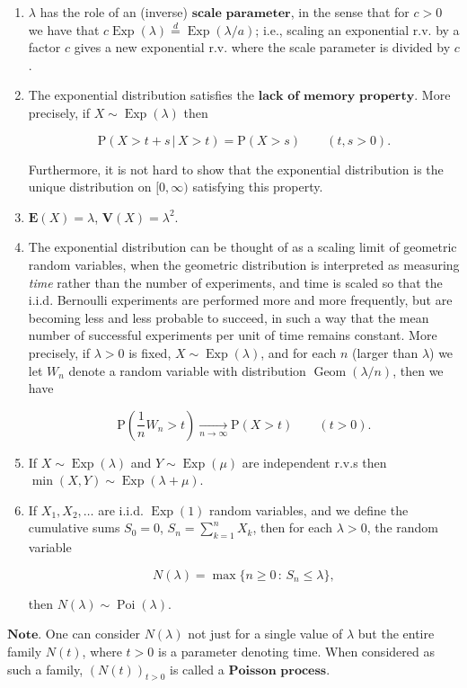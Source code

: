 \begin{enumerate}[label=\arabic*.]
\item $\lambda$ has the role of an (inverse)
$\textbf{scale parameter}$, in the sense that for
$c>0$ we have that
$c \operatorname{Exp}(\lambda) \stackrel{d}{=}
\operatorname{Exp}(\lambda / a)$;
i.e., scaling an exponential r.v. by a factor $c$
gives a new exponential r.v. where the scale parameter
is divided by $c$.

\item The exponential distribution satisfies the
$\textbf{lack of memory property}$. More precisely,
if $X\sim \operatorname{Exp}(\lambda)$ then

\[
\mathrm{P}(X > t+s \,|\, X>t) = \mathrm{P}(X>s) \qquad (t,s>0).
\]

\noindent Furthermore, it is not hard to show that the
exponential distribution is the unique distribution on
$[0,\infty)$ satisfying this property.

\item $\mathbf{E}(X) = \lambda$,
$\mathbf{V}(X) = \lambda^2$.

\item The exponential distribution can be thought of as a
scaling limit of geometric random variables, when the
geometric distribution is interpreted as measuring
\emph{time} rather than the number of experiments, and time
is scaled so that the i.i.d. Bernoulli experiments are
performed more and more frequently, but are becoming
less and less probable to succeed, in such a way that
the mean number of successful experiments per unit of
time remains constant. More precisely, if $\lambda>0$
is fixed, $X\sim \operatorname{Exp}(\lambda)$, and
for each $n$ (larger than $\lambda$) we let $W_n$
denote a random variable with distribution
$\operatorname{Geom}(\lambda/n)$, then we have

\[
\mathrm{P}\left(\frac{1}{n} W_n > t\right)  \xrightarrow[n\to\infty]{} \mathrm{P}(X > t) \qquad (t>0).
\]

\item If $X\sim \operatorname{Exp}(\lambda)$ and
$Y \sim \operatorname{Exp}(\mu)$ are independent
r.v.s then
$\min(X,Y) \sim \operatorname{Exp}(\lambda+\mu)$.

\item If $X_1,X_2,\ldots$ are i.i.d. $\operatorname{Exp}(1)$
random variables, and we define the cumulative sums
$S_0=0$, $S_n = \sum_{k=1}^n X_k$, then for each
$\lambda>0$, the random variable

\[
N(\lambda) = \max\{ n\ge 0\,:\, S_n \le \lambda \},
\]

\noindent then $N(\lambda) \sim \operatorname{Poi}(\lambda)$.
\end{enumerate}

\noindent $\textbf{Note.}$ One can consider $N(\lambda)$ not
just for a single value of $\lambda$ but the entire
family $N(t)$, where $t>0$ is a parameter denoting
time. When considered as such a family, $(N(t))_{t>0}$
is called a $\textbf{Poisson process}$.
